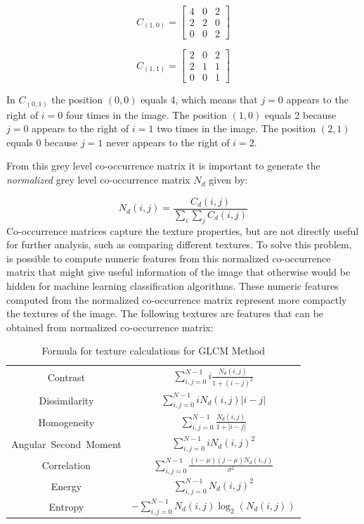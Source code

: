 \begin{equation}
C_{(1,0)}=
    \begin{bmatrix}
    4&0&2\\
    2&2&0\\
    0&0&2
    \end{bmatrix}
\end{equation}{}

\begin{equation}
C_{(1,1)}=
    \begin{bmatrix}
    2&0&2\\
    2&1&1\\
    0&0&1
    \end{bmatrix}
\end{equation}{}

In $C_{(0,1)}$ the position $(0,0)$ equals 4, which means that $j=0$ appears to the right of $i=0$ four times in the image. The position $(1,0)$ equals 2 because $j=0$ appears to the right of $i=1$ two times in the image. The position $(2,1)$ equals 0 because $j=1$ never appears to the right of $i=2$.

From this grey level co-occurrence matrix it is important to generate the \textit{normalized} grey level co-occurrence matrix $N_d$ given by:

\begin{equation}
\label{eq:normalized}
    N_d(i,j) = \frac{C_d(i,j)}{\sum_i\sum_j C_d(i,j)}
\end{equation}
Co-occurrence matrices capture the texture properties, but are not directly useful for further analysis, such as comparing different textures. To solve this problem, is possible to compute numeric features from this normalized co-occurrence matrix that might give useful information of the image that otherwise would be hidden for machine learning classification algorithms. These numeric features computed from the normalized co-occurrence matrix represent more compactly the textures of the image.
The following textures are features that can be obtained from normalized co-occurrence matrix:
\begin{table}[H]
\centering
\begin{tabular}{ |c |c |}
 \hline
 Contrast & $\sum_{i,j=0}^{N-1} i\frac{N_d(i,j)}{1+(i-j)^2}$\\ 
 Dissimilarity & $\sum_{i,j=0}^{N-1} i N_d(i,j)|i-j|$\\
 Homogeneity & $\sum_{i,j=0}^{N-1}\frac{N_d(i,j)}{1+|i-j|}$\\
 Angular\ Second\ Moment & $\sum_{i,j=0}^{N-1} i N_d(i,j)^2$\\
 Correlation & $\sum_{i,j=0}^{N-1}\frac{(i-\mu)(j-\mu)N_d(i,j)}{\sigma^2}$\\
 Energy & $\sum_{i,j=0}^{N-1}N_d(i,j)^2$\\
 Entropy & $ -\sum_{i,j=0}^{N-1}N_d(i,j)\log_2(N_d(i,j))$\\
 \hline
\end{tabular}
\caption{Formula for texture calculations for GLCM Method}
\label{table:glcm_calculations}
\end{table}

